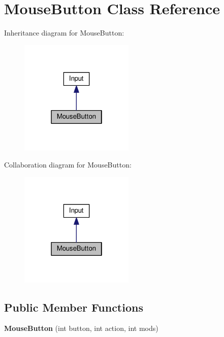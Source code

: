 \hypertarget{classMouseButton}{}\section{Mouse\+Button Class Reference}
\label{classMouseButton}


Inheritance diagram for Mouse\+Button\+:
\nopagebreak
\begin{figure}[H]
\begin{center}
\leavevmode
\includegraphics[width=154pt]{classMouseButton__inherit__graph}
\end{center}
\end{figure}


Collaboration diagram for Mouse\+Button\+:
\nopagebreak
\begin{figure}[H]
\begin{center}
\leavevmode
\includegraphics[width=154pt]{classMouseButton__coll__graph}
\end{center}
\end{figure}
\subsection*{Public Member Functions}
\begin{DoxyCompactItemize}
\item 
\hypertarget{classMouseButton_ad2a2ab9c8a5d0a95bae134566462136c}{}{\bfseries Mouse\+Button} (int button, int action, int mods)\label{classMouseButton_ad2a2ab9c8a5d0a95bae134566462136c}

\end{DoxyCompactItemize}

